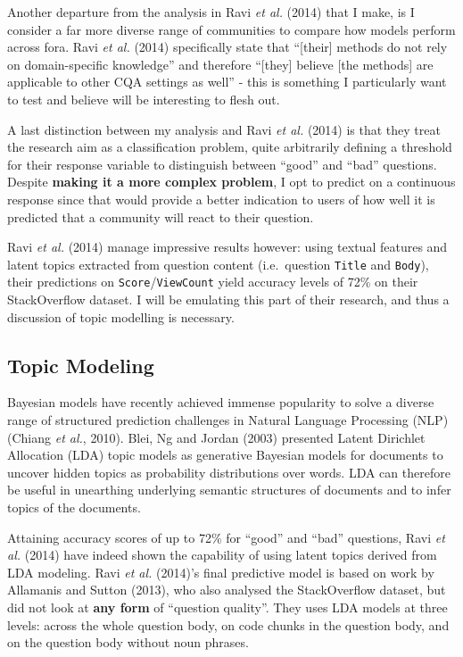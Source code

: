 \documentclass[11pt,preprint, authoryear]{article}
\numberwithin{equation}{section}
\begin{document}
Another departure from the analysis in Ravi \emph{et al.} (2014) that I
make, is I consider a far more diverse range of communities to compare
how models perform across fora. Ravi \emph{et al.} (2014) specifically
state that ``{[}their{]} methods do not rely on domain-specific
knowledge'' and therefore ``{[}they{]} believe {[}the methods{]} are
applicable to other CQA settings as well'' - this is something I
particularly want to test and believe will be interesting to flesh out.

A last distinction between my analysis and Ravi \emph{et al.} (2014) is
that they treat the research aim as a classification problem, quite
arbitrarily defining a threshold for their response variable to
distinguish between ``good'' and ``bad'' questions. Despite
\textbf{making it a more complex problem}, I opt to predict on a
continuous response since that would provide a better indication to
users of how well it is predicted that a community will react to their
question.

Ravi \emph{et al.} (2014) manage impressive results however: using
textual features and latent topics extracted from question content
(i.e.~question \texttt{Title} and \texttt{Body}), their predictions on
\texttt{Score}/\texttt{ViewCount} yield accuracy levels of 72\% on their
StackOverflow dataset. I will be emulating this part of their research,
and thus a discussion of topic modelling is necessary.

\subsection{\texorpdfstring{Topic Modeling
\label{model_lit}}{Topic Modeling }}\label{topic-modeling}

Bayesian models have recently achieved immense popularity to solve a
diverse range of structured prediction challenges in Natural Language
Processing (NLP) (Chiang \emph{et al.}, 2010). Blei, Ng and Jordan
(2003) presented Latent Dirichlet Allocation (LDA) topic models as
generative Bayesian models for documents to uncover hidden topics as
probability distributions over words. LDA can therefore be useful in
unearthing underlying semantic structures of documents and to infer
topics of the documents.

Attaining accuracy scores of up to 72\% for ``good'' and ``bad''
questions, Ravi \emph{et al.} (2014) have indeed shown the capability of
using latent topics derived from LDA modeling. Ravi \emph{et al.}
(2014)'s final predictive model is based on work by Allamanis and Sutton
(2013), who also analysed the StackOverflow dataset, but did not look at
\textbf{any form} of ``question quality''. They uses LDA models at three
levels: across the whole question body, on code chunks in the question
body, and on the question body without noun phrases.
\end{document}
